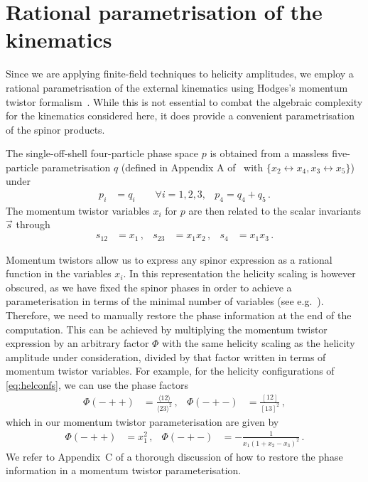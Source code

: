 \section{Rational parametrisation of the kinematics}
\label{app:mtvs}

Since we are applying finite-field techniques to helicity amplitudes, we employ a rational parametrisation of the external kinematics using Hodges's momentum twistor formalism~\cite{Hodges:2009hk}.
While this is not essential to combat the algebraic complexity for the kinematics considered here, it does provide a convenient parametrisation of the spinor products.

The single-off-shell four-particle phase space $p$ is obtained from a massless five-particle parametrisation $q$ (defined in Appendix A of~ with $\{x_2\leftrightarrow x_4,x_3\leftrightarrow x_5\}$) under
\begin{align}
    p_i &= q_i \qquad \forall i=1,2,3, & p_4=q_4+q_5 \, .
\end{align}
The momentum twistor variables $x_i$ for $p$ are then related to the scalar invariants $\vec{s}$ through
\begin{align} \label{eq:mtvs}
    s_{12} &= x_1 \,, &
    s_{23} &= x_1 x_2 \,, &
    s_4 &= x_1 x_3 \,.
\end{align}

Momentum twistors allow us to express any spinor expression as a rational function in the variables $x_i$.
In this representation the helicity scaling is however obscured, as we have fixed the spinor phases in order to achieve a parameterisation in terms of the minimal number of variables (see e.g.~).
Therefore, we need to manually restore the phase information at the end of the computation.
This can be achieved by multiplying the momentum twistor expression by an arbitrary factor $\Phi$ with the same helicity scaling as the helicity amplitude under consideration, divided by that factor written in terms of momentum twistor variables.
For example, for the helicity configurations of \cref{eq:helconfs}, we can use the phase factors
\begin{align}
  \Phi(-++) &= \frac{\langle 1 2 \rangle}{\langle 2 3 \rangle^2} \,,&
  \Phi(-+-) &= \frac{[ 1 2 ]}{[ 1 3 ]^2} \,,
\end{align}
which in our momentum twistor parameterisation are given by
\begin{align}
  \Phi(-++) &= x_1^2 \,,&
  \Phi(-+-) &= - \frac{1}{x_1 (1 + x_2 - x_3)^2}   \,.
\end{align}
We refer to Appendix~C of  a thorough discussion of how to restore the phase information in a momentum twistor parameterisation.


